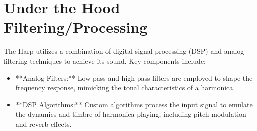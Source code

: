 \chapter{Under the Hood Filtering/Processing}

The Harp utilizes a combination of digital signal processing (DSP) and analog filtering techniques to achieve its sound. Key components include:
\begin{itemize}
\item **Analog Filters:** Low-pass and high-pass filters are employed to shape the frequency response, mimicking the tonal characteristics of a harmonica.
\item **DSP Algorithms:** Custom algorithms process the input signal to emulate the dynamics and timbre of harmonica playing, including pitch modulation and reverb effects.
\end{itemize}
